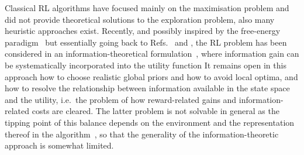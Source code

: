 \documentclass{article}
\begin{document}
Classical RL algorithms
have focused mainly on the maximisation problem and did not provide theoretical 
solutions to the exploration problem, also many heuristic approaches exist.
Recently, and possibly inspired by the free-energy paradigm~\cite{friston2006free}
but essentially going back to Refs.~\cite{still2012information} and \cite{bialek1999predictive}, 
the RL problem has been considered in an information-theoretical 
formulation~\cite{tschantz2020reinforcement}, 
where information gain can be  systematically incorporated into the utility function
It remains open in this approach how to choose realistic global priors and how to avoid
local optima, and
how to resolve the relationship between information available 
in the state space and the utility, i.e.~the problem of how reward-related gains and 
information-related costs are cleared. The latter problem is not solvable in general as
the tipping point of this balance depends on the environment and the representation thereof
in the algorithm~\cite{smith2018evaluation}, so that the generality of the 
information-theoretic approach is somewhat limited.
%
%
%
\end{document}
